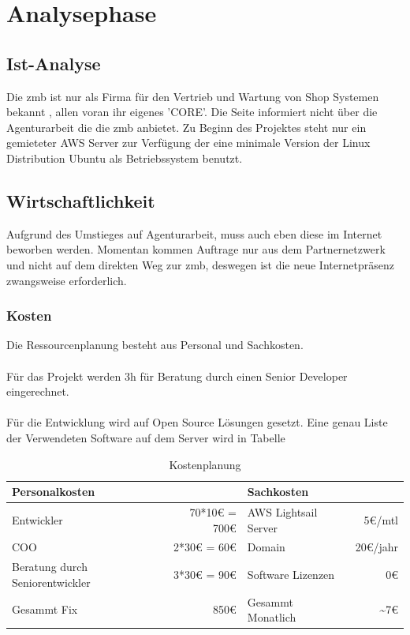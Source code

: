 \documentclass[11pt,a4paper]{article}
\begin{document}
\section{Analysephase}
\subsection{Ist-Analyse}
Die zmb ist nur als Firma für den Vertrieb und Wartung von Shop Systemen bekannt , allen voran ihr eigenes 'CORE'. Die Seite informiert nicht über die Agenturarbeit die die zmb anbietet. 
Zu Beginn des Projektes steht nur ein gemieteter AWS Server zur Verfügung der eine minimale   Version der Linux Distribution Ubuntu als Betriebssystem benutzt. 
\subsection{Wirtschaftlichkeit}
Aufgrund des Umstieges auf Agenturarbeit, muss auch eben diese  im Internet beworben werden. Momentan kommen Auftrage nur aus dem Partnernetzwerk und nicht auf dem direkten Weg zur zmb, deswegen ist die neue Internetpräsenz zwangsweise erforderlich.
\subsubsection{Kosten}
Die Ressourcenplanung besteht aus Personal und Sachkosten.\\\\
Für das Projekt werden 3h für Beratung durch einen Senior Developer eingerechnet.\\\\
Für die Entwicklung wird auf Open Source Lösungen gesetzt. Eine genau Liste der Verwendeten Software auf dem Server wird in Tabelle %
\begin{table}[!ht]
  \centering
     \begin{tabular}{l|r||l|r}
       \textbf{Personalkosten}  & &\textbf{Sachkosten}& \\
       \hline
       Entwickler      &    70*10€ = 700€    &  AWS Lightsail Server      &     5€/mtl\\
       COO    &  2*30€ = 60€               	    &  Domain & 20€/jahr\\
       Beratung durch Seniorentwickler    &  3*30€ = 90€ & Software Lizenzen & 0€	\\ 
       \hline
       \hline
       Gesammt Fix& 850€ & Gesammt Monatlich & \textasciitilde 7€  \\
     \end{tabular}
\caption{Kostenplanung}
\label{tbl:Kostenplanung}
\end{table}
\end{document}
